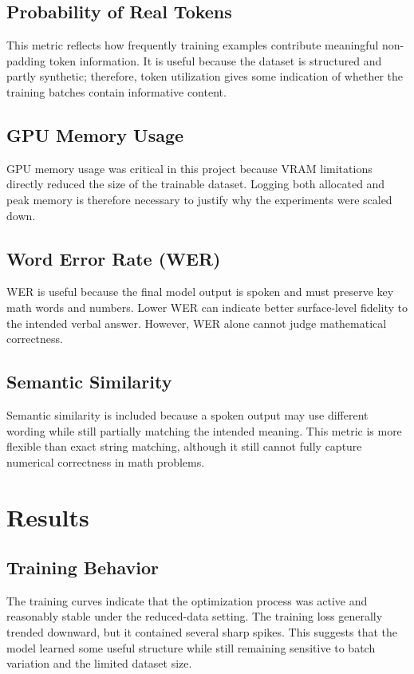 \documentclass[12pt,a4paper]{article}
\begin{document}
\subsection{Probability of Real Tokens}
This metric reflects how frequently training examples contribute meaningful non-padding token information. It is useful because the dataset is structured and partly synthetic; therefore, token utilization gives some indication of whether the training batches contain informative content.

\subsection{GPU Memory Usage}
GPU memory usage was critical in this project because VRAM limitations directly reduced the size of the trainable dataset. Logging both allocated and peak memory is therefore necessary to justify why the experiments were scaled down.

\subsection{Word Error Rate (WER)}
WER is useful because the final model output is spoken and must preserve key math words and numbers. Lower WER can indicate better surface-level fidelity to the intended verbal answer. However, WER alone cannot judge mathematical correctness.

\subsection{Semantic Similarity}
Semantic similarity is included because a spoken output may use different wording while still partially matching the intended meaning. This metric is more flexible than exact string matching, although it still cannot fully capture numerical correctness in math problems.

\section{Results}
\subsection{Training Behavior}
The training curves indicate that the optimization process was active and reasonably stable under the reduced-data setting. The training loss generally trended downward, but it contained several sharp spikes. This suggests that the model learned some useful structure while still remaining sensitive to batch variation and the limited dataset size.
\end{document}
